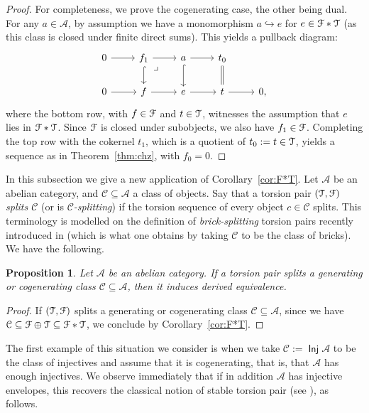 \documentclass[a4paper,11pt]{amsart}
\theoremstyle{plain}
\newtheorem{prop}[thm]{Proposition}
\theoremstyle{definition}
\newcommand{\Acal}{\mathcal{A}} \newcommand{\Bcal}{\mathcal{B}} \newcommand{\Ccal}{\mathcal{C}}
\DeclareMathOperator{\Inj}{\mathsf{Inj}}
\begin{document}
\begin{proof}
	For completeness, we prove the cogenerating case, the other being dual. For any $a\in\Acal$, by
	assumption we have a monomorphism $a\hookrightarrow e$ for
	$e\in\mathcal{F}\ast\mathcal{T}$ (as this class is closed under finite direct sums). This yields a pullback diagram:
	\[\begin{tikzcd}
		0 \arrow{r} & f_1 \arrow[hook]{d} \arrow{r}
			\arrow[phantom,description,very near start, "\lrcorner"]{dr} &
			a \arrow[hook]{d} \arrow{r} & t_0 \arrow[equal]{d} \\
		0 \arrow{r} & f \arrow{r} & e \arrow{r} & t \arrow{r} & 0,
	\end{tikzcd}\]
	where the bottom row, with $f\in\mathcal{F}$ and $t\in\mathcal{T}$, witnesses the
	assumption that $e$ lies in $\mathcal{F}\ast\mathcal{T}$. Since $\mathcal{F}$ is closed under
	subobjects, we also
	have $f_1\in\mathcal{F}$. Completing the top row with the cokernel $t_1$, which
	is a quotient of $t_0:=t\in\mathcal{T}$, yields a
	sequence as in Theorem~\ref{thm:chz}, with $f_0=0$.
\end{proof}

In this subsection we give a new application of Corollary~\ref{cor:F*T}.
Let $\Acal$ be an abelian category, and $\Ccal\subseteq\Acal$ a class of
objects. Say that a torsion pair $(\mathcal{T},\mathcal{F})$ \emph{splits
$\Ccal$} (or is \emph{$\Ccal$-splitting}) if the torsion sequence of every
object $c\in\Ccal$ splits.
This terminology is modelled on the definition of \emph{brick-splitting} torsion pairs
recently introduced in \cite{asai-iyam-mous-paqu-25} (which is what one obtains
by taking $\Ccal$ to be the class of bricks). We have the following.

\begin{prop}\label{prop:cogen-splitting}
	Let $\Acal$ be an abelian category. If a torsion pair splits a
	generating or cogenerating class $\Ccal\subseteq\Acal$, then it induces
	derived equivalence.
\end{prop}

\begin{proof}
	If $(\mathcal{T},\mathcal{F})$ splits a generating or cogenerating class
	$\Ccal\subseteq\Acal$, since we have
	$\Ccal\subseteq\Fcal\oplus\Tcal\subseteq\Fcal\ast\Tcal$, we conclude by
	Corollary~\ref{cor:F*T}.
\end{proof}

The first example of this situation we consider is when we take
$\Ccal:=\Inj\Acal$ to be the class of injectives and assume that it is
cogenerating, that is, that $\Acal$ has enough injectives. We observe
immediately that if in addition $\Acal$ has injective envelopes, this recovers
the classical notion of stable torsion pair (see \cite[\S{}VI.7]{sten-75}), as
follows.
\end{document}
